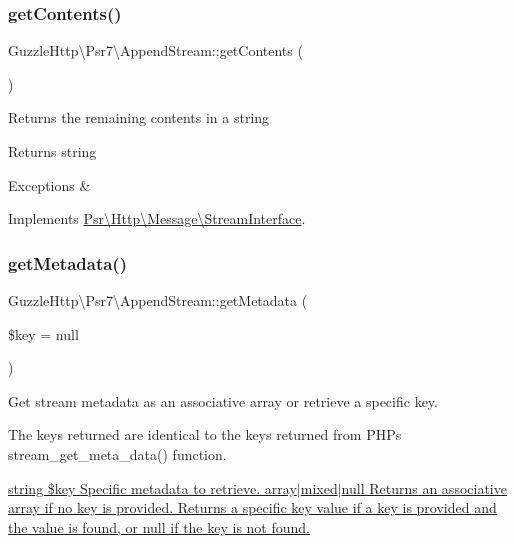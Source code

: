 \subsubsection{\texorpdfstring{get\+Contents()}{getContents()}}
{\footnotesize\ttfamily Guzzle\+Http\textbackslash{}\+Psr7\textbackslash{}\+Append\+Stream\+::get\+Contents (\begin{DoxyParamCaption}{ }\end{DoxyParamCaption})}

Returns the remaining contents in a string

\begin{DoxyReturn}{Returns}
string 
\end{DoxyReturn}

\begin{DoxyExceptions}{Exceptions}
{\em } & \\
\hline
\end{DoxyExceptions}


Implements \hyperlink{interfacePsr_1_1Http_1_1Message_1_1StreamInterface_a77f73d536f77e4a4e281d548ee905276}{Psr\textbackslash{}\+Http\textbackslash{}\+Message\textbackslash{}\+Stream\+Interface}.

\mbox{\label{classGuzzleHttp_1_1Psr7_1_1AppendStream_afc64ba83a220f390693d76ccf5aca203}} 
\subsubsection{\texorpdfstring{get\+Metadata()}{getMetadata()}}
{\footnotesize\ttfamily Guzzle\+Http\textbackslash{}\+Psr7\textbackslash{}\+Append\+Stream\+::get\+Metadata (\begin{DoxyParamCaption}\item[{}]{\$key = {\ttfamily null} }\end{DoxyParamCaption})}

Get stream metadata as an associative array or retrieve a specific key.

The keys returned are identical to the keys returned from P\+HP\textquotesingle{}s stream\+\_\+get\+\_\+meta\+\_\+data() function.

\hyperlink{}{string \$key Specific metadata to retrieve.  array$\vert$mixed$\vert$null Returns an associative array if no key is provided. Returns a specific key value if a key is provided and the value is found, or null if the key is not found. }

